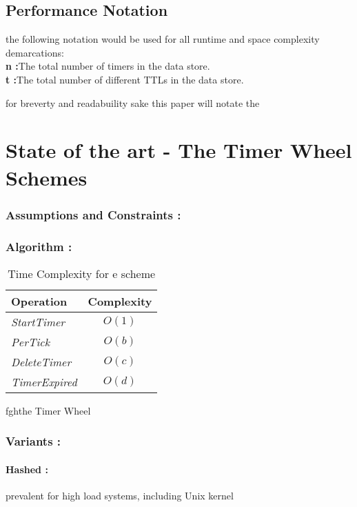 \documentclass[twocolumn,a4paper]{article}
\newcommand{\complexity}[5]{
\begin{table}[h!]
	\begin{center}
		\begin{tabular}{l|c}
			\textbf{Operation} & \textbf{Complexity} \\
			\hline
			\textit{StartTimer} & $O(#1)$  \\
			\textit{PerTick} & $O(#2)$ \\
			\textit{DeleteTimer} & $O(#3)$ \\
			\textit{TimerExpired} & $O(#4)$ \\
		\end{tabular}
		\caption{Time Complexity for #5 scheme}
	\end{center}
\end{table}
}
\begin{document}

\subsection{Performance Notation}

the following notation would be used for all runtime and space complexity demarcations: \\
\indent\textbf{n :}The total number of timers in the data store.\\
\indent\textbf{t :}The total number of different TTLs in the data store. \\

\vspace{15mm}



for breverty and readabuility sake this paper will notate the 

\section{State of the art - The Timer Wheel Schemes}


\subsubsection{Assumptions and Constraints :}

\subsubsection{Algorithm :}

\complexity{1}{b}{c}{d}{e}{f}{g}{h}{the Timer Wheel}


\subsubsection{Variants :}

\paragraph{Hashed :}
prevalent for high load systems, including Unix kernel
\end{document}
